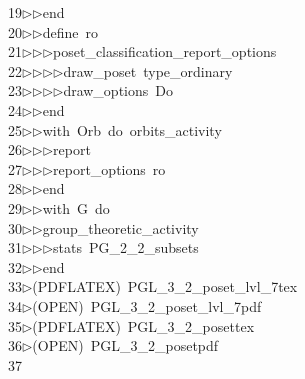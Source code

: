 \begin{tabbing}
19\>$\triangleright$\>$\triangleright$\>end\ \\[0pt]
20\>$\triangleright$\>$\triangleright$\>define\ ro\ \\[0pt]
21\>$\triangleright$\>$\triangleright$\>$\triangleright$\>poset\_classification\_report\_options\ \\[0pt]
22\>$\triangleright$\>$\triangleright$\>$\triangleright$\>$\triangleright$\>draw\_poset\ type\_ordinary\ \\[0pt]
23\>$\triangleright$\>$\triangleright$\>$\triangleright$\>$\triangleright$\>draw\_options\ Do\ \\[0pt]
24\>$\triangleright$\>$\triangleright$\>end\ \\[0pt]
25\>$\triangleright$\>$\triangleright$\>with\ Orb\ do\ orbits\_activity\ \\[0pt]
26\>$\triangleright$\>$\triangleright$\>$\triangleright$\>report\ \ \\[0pt]
27\>$\triangleright$\>$\triangleright$\>$\triangleright$\>report\_options\ ro\ \\[0pt]
28\>$\triangleright$\>$\triangleright$\>end\ \\[0pt]
29\>$\triangleright$\>$\triangleright$\>with\ G\ do\ \\[0pt]
30\>$\triangleright$\>$\triangleright$\>group\_theoretic\_activity\ \\[0pt]
31\>$\triangleright$\>$\triangleright$\>$\triangleright$\>stats\ PG\_2\_2\_subsets\ \\[0pt]
32\>$\triangleright$\>$\triangleright$\>end\\[0pt]
33\>$\triangleright$\>(PDFLATEX)\ PGL\_3\_2\_poset\_lvl\_7tex\\[0pt]
34\>$\triangleright$\>(OPEN)\ PGL\_3\_2\_poset\_lvl\_7pdf\\[0pt]
35\>$\triangleright$\>(PDFLATEX)\ PGL\_3\_2\_posettex\\[0pt]
36\>$\triangleright$\>(OPEN)\ PGL\_3\_2\_posetpdf\\[0pt]
37\>\end{tabbing}
